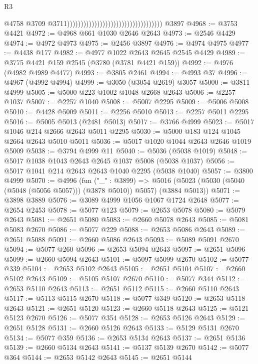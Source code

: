 \begin{lexlean}{R3}
\begin{coremodule}
                                                                          @4758
                                                                          @3709
                                                                          @3711)))))))))))))))))))))))))))))))))))
    @3897
@4968 := @3753 @4421
@4972 := @4968 @661 @1030 @2646 @2643
@4973 := @2546 @4429
@4974 := @4972 @4973
@4975 := @2456 @3897
@4976 := @4974 @4975
@4977 := @4438 @177
@4982 := @4977 @1022 @2643 @2645 @2545 @4429
@4989 := @3775 @4421 @159 @2545 (@3780 (@3781 @4421 @159))
@4992 := @4976 (@4982 @4989 @4477)
@4993 := @3805 @2461
@4994 := @4993 @37
@4996 := @4967 (@4992 @4994)
@4999 := @3050 (@3054 @2619) @3057
@5000 := @3811 @4999
@5005 := @5000 @223 @1002 @1048 @2668 @2643
@5006 := @2257 @1037
@5007 := @2257 @1040
@5008 := @5007 @2295
@5009 := @5006 @5008
@5010 := @4428 @5009
@5011 := @2256 @5010
@5013 := @2257 @5011 @2295
@5016 := @5005 @5013 (@2481 @5013)
@5017 := @3766 @4999
@5023 := @5017 @1046 @214 @2666 @2643 @5011 @2295
@5030 := @5000 @183 @124 @1045 @2664 @2643 @5010 @5011
@5036 := @5017 @1020 @1044 @2643 @2646 @1019 @5009
@5038 := @3794 @4999 @11
@5040 := @5036 (@5038 @1019)
@5048 := @5017 @1038 @1043 @2643 @2645 @1037 @5008 (@5038 @1037)
@5056 := @5017 @1041 @214 @2643 @2643 @1040 @2295 (@5038 @1040)
@5057 := @3800 @4999
@5070 := @4996
    (fun ("_" : @3899) =>
    @5016 (@5023 (@5030 (@5040 (@5048 (@5056 @5057))) (@3878 @5010)) @5057) (@3884 @5013))
@5071 := @3898 @3889
@5076 := @3089 @4999 @1056 @1067 @1724 @2648
@5077 := @2654 @2453
@5078 := @5077 @123
@5079 := @2653 @5078
@5080 := @5079 @2643
@5081 := @2651 @5080
@5083 := @2660 @5078 @2643
@5085 := @5081 @5083 @2670
@5086 := @5077 @229
@5088 := @2653 @5086 @2643
@5089 := @2651 @5088
@5091 := @2660 @5086 @2643
@5093 := @5089 @5091 @2670
@5094 := @5077 @260
@5096 := @2653 @5094 @2643
@5097 := @2651 @5096
@5099 := @2660 @5094 @2643
@5101 := @5097 @5099 @2670
@5102 := @5077 @339
@5104 := @2653 @5102 @2643
@5105 := @2651 @5104
@5107 := @2660 @5102 @2643
@5109 := @5105 @5107 @2670
@5110 := @5077 @344
@5112 := @2653 @5110 @2643
@5113 := @2651 @5112
@5115 := @2660 @5110 @2643
@5117 := @5113 @5115 @2670
@5118 := @5077 @349
@5120 := @2653 @5118 @2643
@5121 := @2651 @5120
@5123 := @2660 @5118 @2643
@5125 := @5121 @5123 @2670
@5126 := @5077 @354
@5128 := @2653 @5126 @2643
@5129 := @2651 @5128
@5131 := @2660 @5126 @2643
@5133 := @5129 @5131 @2670
@5134 := @5077 @359
@5136 := @2653 @5134 @2643
@5137 := @2651 @5136
@5139 := @2660 @5134 @2643
@5141 := @5137 @5139 @2670
@5142 := @5077 @364
@5144 := @2653 @5142 @2643
@5145 := @2651 @5144

\end{coremodule}
\end{lexlean}
